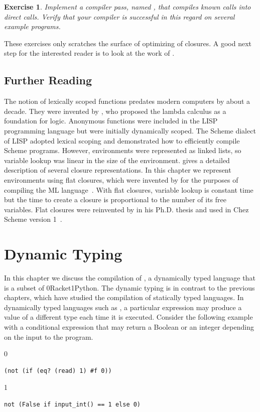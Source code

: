 \documentclass[7x10,nocrop]{TimesAPriori_MIT}%
\def\racketEd{0}
\def\pythonEd{1}
\def\edition{0}
\newcommand{\racket}[1]{{\if\edition\racketEd{#1}\fi}}
\newcommand{\python}[1]{{\if\edition\pythonEd #1\fi}}
\newtheorem{exercise}[theorem]{Exercise}
\begin{document}
\begin{exercise}\normalfont\normalsize
Implement a compiler pass, named , that
compiles known calls into direct calls. Verify that your compiler is
successful in this regard on several example programs.
\end{exercise}

These exercises only scratches the surface of optimizing of
closures. A good next step for the interested reader is to look at the
work of \citet{Keep:2012ab}.

\section{Further Reading}

The notion of lexically scoped functions predates modern computers by
about a decade. They were invented by \citet{Church:1932aa}, who
proposed the lambda calculus as a foundation for logic. Anonymous
functions were included in the LISP~\citep{McCarthy:1960dz}
programming language but were initially dynamically scoped. The Scheme
dialect of LISP adopted lexical scoping and
\citet{Guy-L.-Steele:1978yq} demonstrated how to efficiently compile
Scheme programs. However, environments were represented as linked
lists, so variable lookup was linear in the size of the
environment. \citet{Appel91} gives a detailed description of several
closure representations. In this chapter we represent environments
using flat closures, which were invented by
\citet{Cardelli:1983aa,Cardelli:1984aa} for the purposes of compiling
the ML language~\citep{Gordon:1978aa,Milner:1990fk}.  With flat
closures, variable lookup is constant time but the time to create a
closure is proportional to the number of its free variables.  Flat
closures were reinvented by \citet{Dybvig:1987ab} in his Ph.D. thesis
and used in Chez Scheme version 1~\citep{Dybvig:2006aa}.



\chapter{Dynamic Typing}
\label{ch:Ldyn}

In this chapter we discuss the compilation of \LangDyn{}, a
dynamically typed language that is a subset of
\racket{Racket}\python{Python}. The dynamic typing is in contrast to
the previous chapters, which have studied the compilation of
statically typed languages. In dynamically typed languages such as
\LangDyn{}, a particular expression may produce a value of a different
type each time it is executed. Consider the following example with a
conditional  expression that may return a Boolean or an
integer depending on the input to the program.
{\if\edition\racketEd
\begin{lstlisting}
(not (if (eq? (read) 1) #f 0))
\end{lstlisting}
\fi}
{\if\edition\pythonEd
\begin{lstlisting}
not (False if input_int() == 1 else 0)
\end{lstlisting}
\fi}
\end{document}
